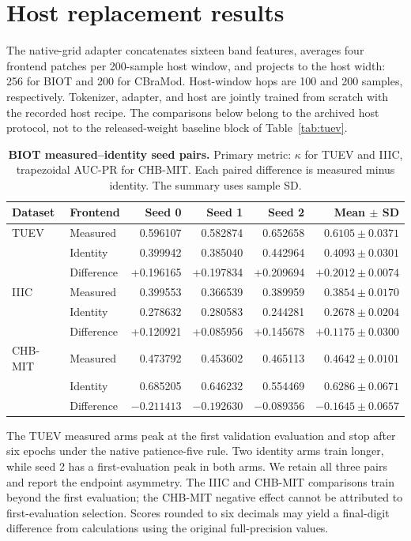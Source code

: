 \documentclass[10pt,twocolumn,letterpaper]{article}
\newcommand{\TableStyle}{\fontsize{8}{9.5}\selectfont\setlength{\tabcolsep}{3pt}\renewcommand{\arraystretch}{1.10}}
\begin{document}
\section{Host replacement results}
\label{app:hosts}
The native-grid adapter concatenates sixteen band features, averages
four frontend patches per 200-sample host window, and projects to the
host width: 256 for BIOT and 200 for CBraMod. Host-window hops are
100 and 200 samples, respectively. Tokenizer, adapter, and host are
jointly trained from scratch with the recorded host recipe.
The comparisons below belong to the archived host protocol, not to
the released-weight baseline block of Table~\ref{tab:tuev}.

\begin{table}[t]
\centering\TableStyle
\caption{\textbf{BIOT measured--identity seed pairs.} Primary metric:
$\kappa$ for TUEV and IIIC, trapezoidal AUC-PR for CHB-MIT. Each paired
difference is measured minus identity. The summary uses sample SD.}
\label{tab:host-pairs}
\begin{tabular}{llrrrr}
\toprule
Dataset & Frontend & Seed 0 & Seed 1 & Seed 2 & Mean $\pm$ SD\\
\midrule
TUEV & Measured & 0.596107 & 0.582874 & 0.652658 & $0.6105\pm0.0371$\\
 & Identity & 0.399942 & 0.385040 & 0.442964 & $0.4093\pm0.0301$\\
 & Difference & +0.196165 & +0.197834 & +0.209694 & $+0.2012\pm0.0074$\\
\midrule
IIIC & Measured & 0.399553 & 0.366539 & 0.389959 & $0.3854\pm0.0170$\\
 & Identity & 0.278632 & 0.280583 & 0.244281 & $0.2678\pm0.0204$\\
 & Difference & +0.120921 & +0.085956 & +0.145678 & $+0.1175\pm0.0300$\\
\midrule
CHB-MIT & Measured & 0.473792 & 0.453602 & 0.465113 & $0.4642\pm0.0101$\\
 & Identity & 0.685205 & 0.646232 & 0.554469 & $0.6286\pm0.0671$\\
 & Difference & $-0.211413$ & $-0.192630$ & $-0.089356$ & $-0.1645\pm0.0657$\\
\bottomrule
\end{tabular}
\end{table}

The TUEV measured arms peak at the first validation evaluation and stop
after six epochs under the native patience-five rule. Two identity
arms train longer, while seed 2 has a first-evaluation peak in both
arms. We retain all three pairs and report the endpoint asymmetry.
The IIIC and CHB-MIT comparisons train beyond the first evaluation;
the CHB-MIT negative effect cannot be attributed to first-evaluation
selection. Scores rounded to six decimals may yield a final-digit
difference from calculations using the original full-precision values.
\end{document}
